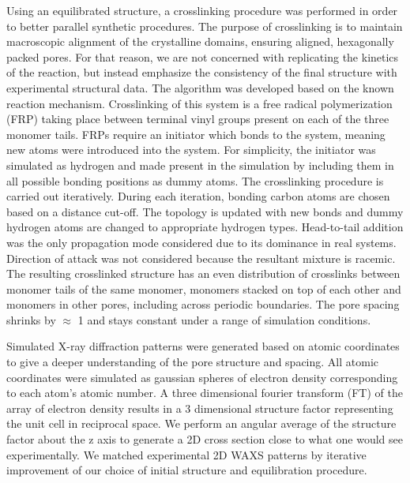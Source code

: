 Using an equilibrated structure, a crosslinking procedure was performed
in order to better parallel synthetic procedures. The purpose of 
crosslinking is to maintain macroscopic alignment of the crystalline
domains, ensuring aligned, hexagonally packed pores. For that reason, we
are not concerned with replicating the kinetics of the reaction, but
instead emphasize the consistency of the final structure with experimental
structural data. The algorithm was developed based on the known reaction
mechanism. Crosslinking of this system is a free radical polymerization (FRP)
taking place between terminal vinyl groups present on each of the three
monomer tails. FRPs require an initiator which bonds to the system, 
meaning new atoms were introduced into the system. For simplicity, the 
initiator was simulated as hydrogen and made present in the simulation
by including them in all possible bonding positions as dummy atoms.
The crosslinking procedure is carried out iteratively. During each 
iteration, bonding carbon atoms are chosen based on a distance cut-off.
The topology is updated with new bonds and dummy hydrogen atoms are 
changed to appropriate hydrogen types. Head-to-tail addition was the
only propagation mode considered due to its dominance in real systems.
Direction of attack was not considered because the resultant mixture is
racemic. The resulting crosslinked structure has an even distribution of
crosslinks between monomer tails of the same monomer, monomers stacked on
top of each other and monomers in other pores, including across periodic
boundaries. The pore spacing shrinks by $\approx$ 1 \angstrom and stays 
constant under a range of simulation conditions. 

Simulated X-ray diffraction patterns were generated based on atomic
coordinates to give a deeper understanding of the pore structure and
spacing. All atomic coordinates were simulated as gaussian spheres of
electron density  corresponding to each atom's atomic number. A three
dimensional fourier transform (FT) of the array of electron density 
results in a 3 dimensional structure factor representing the unit cell
in reciprocal space. We perform an angular average of the structure factor
about the z axis to generate a 2D cross section close to what one would see
experimentally. We matched experimental 2D WAXS patterns by iterative
improvement of our choice of initial structure and equilibration procedure. 

